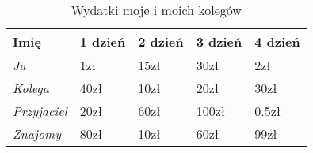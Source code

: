 \begin{table}[htbt]
\begin{center}
\begin{tabular}{|l|l|l|l|l|}
\hline
\textbf{Imię}       & \textbf{1 dzień} & \textbf{2 dzień} & \textbf{3 dzień} & \textbf{4 dzień} \\ \hline
\textit{Ja}         & 1zł              & 15zł             & 30zł             & 2zł              \\ \hline
\textit{Kolega}     & 40zł             & 10zł             & 20zł             & 30zł             \\ \hline
\textit{Przyjaciel} & 20zł             & 60zł             & 100zł            & 0.5zł            \\ \hline
\textit{Znajomy}    & 80zł             & 10zł             & 60zł             & 99zł             \\ \hline
\end{tabular}
\caption{Wydatki moje i moich kolegów}
\label{tab:pieniedzy}
\end{center}
\end{table}
